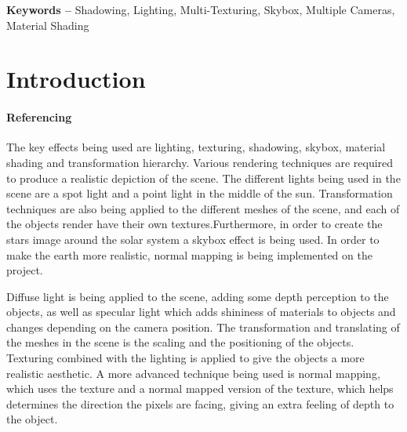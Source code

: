 \documentclass[10pt, a4paper]{article}
\title{\mytitle}
\author{\myauthor\hspace{1em}\\\contact\\Edinburgh Napier University\hspace{0.5em}-\hspace{0.5em}\mymodule}
\date{}
\newcommand{\figuremacro}[5]{
    \begin{figure}[#1]
        \centering
        \texttt{[image: \#2]}
        \caption[#3]{\textbf{#3}#4}
        \label{fig:#2}
    \end{figure}
}
\begin{document}
	
		\hyphenchar{}    
	
	\maketitle
	\begin{abstract}
	The aim of this project was to render a realistic scene using the skills developed in the Computer Graphics Module at Edinburgh Napier University using OpenGL and C++. The scene produced in this project is a solar system, inspired by my adoration for the stars and the Star Wars movies \cite{StarWars}. I was also inspired by some of the previous Computer Graphics Projects \cite{PreviousProjects}. Advanced 3D effects and techniques are used to accomplish the generated result, such as lighting,shadowing and texturing. These techniques are widely used in a variety of games.
	\figuremacro{h}{MillenniumFalcon}{Millenium Falcon}{ - Chase Camera Inspiration}{1.0}
	\end{abstract}
    
	\textbf{Keywords -- }{Shadowing, Lighting, Multi-Texturing, Skybox, Multiple Cameras, Material Shading}
	\section{Introduction}
    \paragraph{Referencing}

    The key effects being used are lighting, texturing, shadowing, skybox, material shading and transformation hierarchy. Various rendering techniques are required to produce a realistic depiction of the scene. The different lights being used in the scene are a spot light and a point light in the middle of the sun. Transformation techniques are also being applied to the different meshes of the scene, and each of the objects render have their own textures.Furthermore, in order to create the stars image around the solar system a skybox effect is being used. In order to make the earth more realistic, normal mapping is being implemented on the project.
    
    Diffuse light is being applied to the scene, adding some depth perception to the objects, as well as specular light which adds shininess of materials to objects and changes depending on the camera position. The transformation and translating of the meshes in the scene is the scaling and the positioning of the objects. Texturing combined with the lighting is applied to give the objects a more realistic aesthetic.  A more advanced technique being used is normal mapping, which uses the texture and a normal mapped version of the texture, which helps determines the direction the pixels are facing, giving an extra feeling of depth to the object.
    
\end{document}
